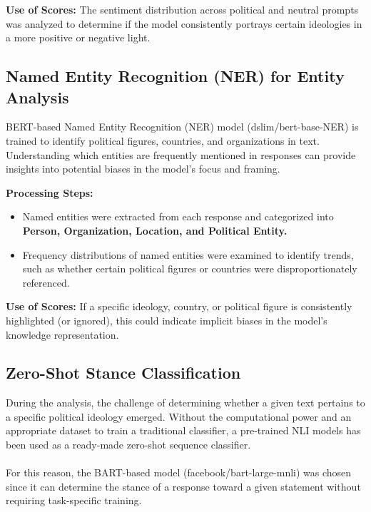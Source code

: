 \documentclass[pdflatex,sn-mathphys-num]{sn-jnl}%
\theoremstyle{thmstyleone}%
\theoremstyle{thmstyletwo}%
\theoremstyle{thmstylethree}%
\begin{document}
\textbf{Use of Scores:} The sentiment distribution across political and neutral prompts was analyzed to determine if the model consistently portrays certain ideologies in a more positive or negative light.  

\subsection{Named Entity Recognition (NER) for Entity Analysis}

BERT-based Named Entity Recognition (NER) model (dslim/bert-base-NER)\cite{DBLP:journals/corr/abs-1810-04805}\cite{tjong-kim-sang-de-meulder-2003-introduction} is trained to identify political figures, countries, and organizations in text. Understanding which entities are frequently mentioned in responses can provide insights into potential biases in the model’s focus and framing.

\textbf{Processing Steps:}  
\begin{itemize}
    \item Named entities were extracted from each response and categorized into \textbf{Person, Organization, Location, and Political Entity.}
    \item Frequency distributions of named entities were examined to identify trends, such as whether certain political figures or countries were disproportionately referenced.
\end{itemize}  

\textbf{Use of Scores:} If a specific ideology, country, or political figure is consistently highlighted (or ignored), this could indicate implicit biases in the model’s knowledge representation.  

\subsection{Zero-Shot Stance Classification}
During the analysis, the challenge of determining whether a given text pertains to a specific political ideology emerged. Without the computational power and an appropriate dataset to train a traditional classifier, a pre-trained NLI models has been used as a ready-made zero-shot sequence classifier.
\\\\
For this reason, the BART-based model (facebook/bart-large-mnli)\cite{DBLP:journals/corr/abs-1910-13461} was chosen since it can determine the stance of a response toward a given statement without requiring task-specific training.  
\end{document}
